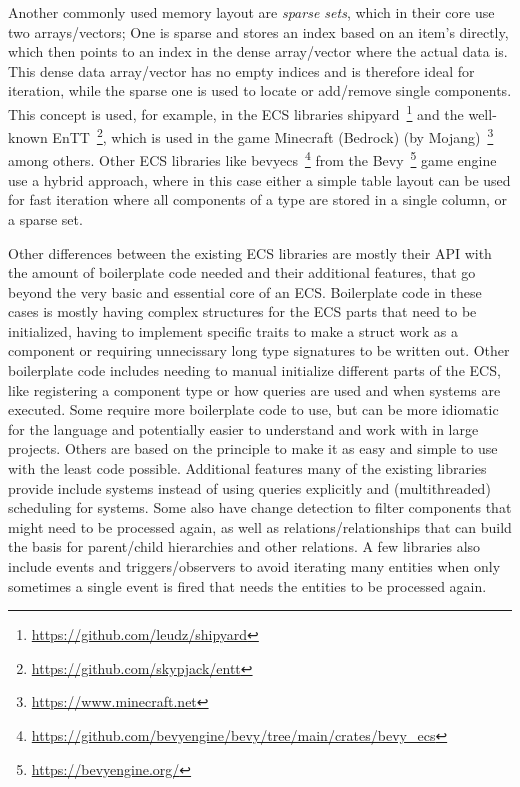 Another commonly used memory layout are \textit{sparse sets}, which in their core use two arrays/vectors; One is sparse and stores an index based on an item's directly, which then points to an index in the dense array/vector where the actual data is. This dense data array/vector has no empty indices and is therefore ideal for iteration, while the sparse one is used to locate or add/remove single components. This concept is used, for example, in the ECS libraries \textsf{shipyard}~\footnote{\url{https://github.com/leudz/shipyard}} and the well-known \textsf{EnTT}~\footnote{\url{https://github.com/skypjack/entt}}, which is used in the game \textsf{Minecraft (Bedrock)} (by Mojang)~\footnote{\url{https://www.minecraft.net}} among others. Other ECS libraries like \textsf{bevy\textunderscore ecs}~\footnote{\url{https://github.com/bevyengine/bevy/tree/main/crates/bevy_ecs}} from the \textsf{Bevy}~\footnote{\url{https://bevyengine.org/}} game engine use a hybrid approach, where in this case either a simple table layout can be used for fast iteration where all components of a type are stored in a single column, or a sparse set.

Other differences between the existing ECS libraries are mostly their API with the amount of boilerplate code needed and their additional features, that go beyond the very basic and essential core of an ECS. Boilerplate code in these cases is mostly having complex structures for the ECS parts that need to be initialized, having to implement specific traits to make a struct work as a component or requiring unnecissary long type signatures to be written out. Other boilerplate code includes needing to manual initialize different parts of the ECS, like registering a component type or how queries are used and when systems are executed. Some require more boilerplate code to use, but can be more idiomatic for the language and potentially easier to understand and work with in large projects. Others are based on the principle to make it as easy and simple to use with the least code possible. Additional features many of the existing libraries provide include systems instead of using queries explicitly and (multithreaded) scheduling for systems. Some also have change detection to filter components that might need to be processed again, as well as relations/relationships that can build the basis for parent/child hierarchies and other relations. A few libraries also include events and triggers/observers to avoid iterating many entities when only sometimes a single event is fired that needs the entities to be processed again.

